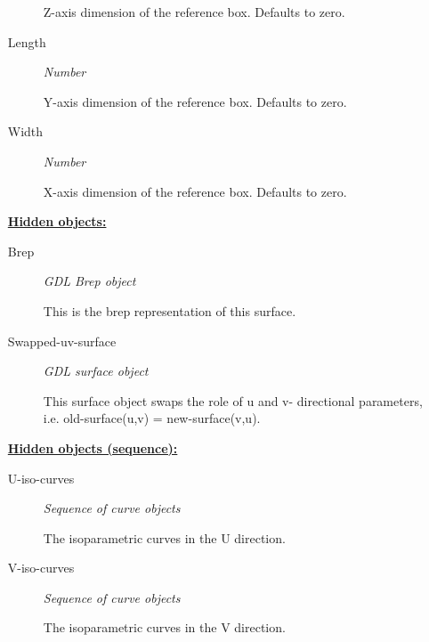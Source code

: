 \documentclass [11pt]{book}
\begin{document}
\begin{itemize}
\begin{description}
 Z-axis dimension of the reference box. Defaults to zero.




\item [Length]
\emph{Number}

 Y-axis dimension of the reference box. Defaults to zero.




\item [Width]
\emph{Number}

 X-axis dimension of the reference box. Defaults to zero.




\end{description}






\textbf{
\underline{Hidden objects:}}

\begin{description}

\item [Brep]
\emph{GDL Brep object}

 This is the brep representation of this surface.




\item [Swapped-uv-surface]
\emph{GDL surface object}

 This surface object swaps the role of u and v- directional parameters, i.e. old-surface(u,v) = new-surface(v,u).




\end{description}






\textbf{
\underline{Hidden objects (sequence):}}

\begin{description}

\item [U-iso-curves]
\emph{Sequence of curve objects}

 The isoparametric curves in the U direction.




\item [V-iso-curves]
\emph{Sequence of curve objects}

 The isoparametric curves in the V direction.





\end{description}
\end{itemize}
\end{document}
